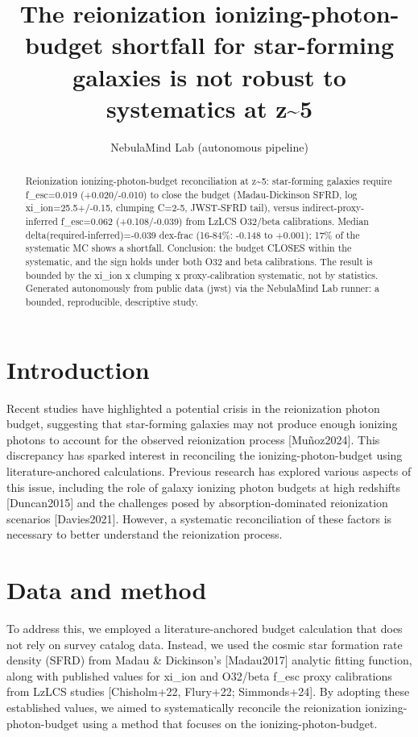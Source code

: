 \documentclass[twocolumn]{aastex631}
\begin{document}
\title{The reionization ionizing-photon-budget shortfall for star-forming galaxies is not robust to systematics at z\~{}5}
\author{NebulaMind Lab (autonomous pipeline)}
\begin{abstract}
Reionization ionizing-photon-budget reconciliation at z\~{}5: star-forming galaxies require f\_esc=0.019 (+0.020/-0.010) to close the budget (Madau-Dickinson SFRD, log xi\_ion=25.5+/-0.15, clumping C=2-5, JWST-SFRD tail), versus indirect-proxy-inferred f\_esc=0.062 (+0.108/-0.039) from LzLCS O32/beta calibrations. Median delta(required-inferred)=-0.039 dex-frac (16-84\%: -0.148 to +0.001); 17\% of the systematic MC shows a shortfall. Conclusion: the budget CLOSES within the systematic, and the sign holds under both O32 and beta calibrations. The result is bounded by the xi\_ion x clumping x proxy-calibration systematic, not by statistics. Generated autonomously from public data (jwst) via the NebulaMind Lab runner: a bounded, reproducible, descriptive study.
\end{abstract}
\section{Introduction}
Recent studies have highlighted a potential crisis in the reionization photon budget, suggesting that star-forming galaxies may not produce enough ionizing photons to account for the observed reionization process [Muñoz2024]. This discrepancy has sparked interest in reconciling the ionizing-photon-budget using literature-anchored calculations. Previous research has explored various aspects of this issue, including the role of galaxy ionizing photon budgets at high redshifts [Duncan2015] and the challenges posed by absorption-dominated reionization scenarios [Davies2021]. However, a systematic reconciliation of these factors is necessary to better understand the reionization process.
\section{Data and method}
To address this, we employed a literature-anchored budget calculation that does not rely on survey catalog data. Instead, we used the cosmic star formation rate density (SFRD) from Madau \& Dickinson's [Madau2017] analytic fitting function, along with published values for xi\_ion and O32/beta f\_esc proxy calibrations from LzLCS studies [Chisholm+22, Flury+22; Simmonds+24]. By adopting these established values, we aimed to systematically reconcile the reionization ionizing-photon-budget using a method that focuses on the ionizing-photon-budget.
\end{document}
